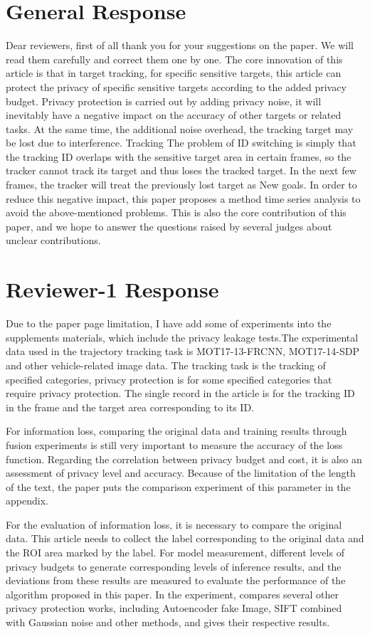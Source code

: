 \documentclass[letterpaper]{article} %
\begin{document}
\section{General Response}
Dear reviewers, first of all thank you for your suggestions on the paper. We will read them carefully and correct them one by one. The core innovation of this article is that in target tracking, for specific sensitive targets, this article can protect the privacy of specific sensitive targets according to the added privacy budget. Privacy protection is carried out by adding privacy noise, it will inevitably have a negative impact on the accuracy of other targets or related tasks. At the same time, the additional noise overhead, the tracking target may be lost due to interference. Tracking The problem of ID switching is simply that the tracking ID overlaps with the sensitive target area in certain frames, so the tracker cannot track its target and thus loses the tracked target. In the next few frames, the tracker will treat the previously lost target as New goals. In order to reduce this negative impact, this paper proposes a method time series analysis to avoid the above-mentioned problems. This is also the core contribution of this paper, and we hope to answer the questions raised by several judges about unclear contributions.

\section{Reviewer-1 Response}
Due to the paper page limitation, I have add some of experiments into the supplements materials, which include the privacy leakage tests.The experimental data used in the trajectory tracking task is MOT17-13-FRCNN, MOT17-14-SDP and other vehicle-related image data. The tracking task is the tracking of specified categories, privacy protection is for some specified categories that require privacy protection. The single record in the article is for the tracking ID in the frame and the target area corresponding to its ID.

For information loss, comparing the original data and training results through fusion experiments is still very important to measure the accuracy of the loss function. Regarding the correlation between privacy budget and cost, it is also an assessment of privacy level and accuracy. Because of the limitation of the length of the text, the paper puts the comparison experiment of this parameter in the appendix.

For the evaluation of information loss, it is necessary to compare the original data. This article needs to collect the label corresponding to the original data and the ROI area marked by the label. For model measurement, different levels of privacy budgets to generate corresponding levels of inference results, and the deviations from these results are measured to evaluate the performance of the algorithm proposed in this paper.
In the experiment, compares several other privacy protection works, including Autoencoder fake Image, SIFT combined with Gaussian noise and other methods, and gives their respective results.
\end{document}
